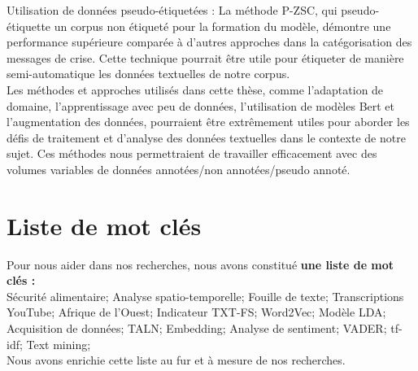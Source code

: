 \documentclass{article}
\begin{document}
Utilisation de données pseudo-étiquetées : La méthode P-ZSC, qui pseudo-étiquette un corpus non étiqueté pour la formation du modèle, démontre une performance supérieure comparée à d'autres approches dans la catégorisation des messages de crise. Cette technique pourrait être utile pour étiqueter de manière semi-automatique les données textuelles de notre corpus. \\

Les méthodes et approches utilisés dans cette thèse, comme l'adaptation de domaine, l'apprentissage avec peu de données, l'utilisation de modèles Bert et l'augmentation des données, pourraient être extrêmement utiles pour aborder les défis de traitement et d'analyse des données textuelles dans le contexte de notre sujet. Ces méthodes nous permettraient de travailler efficacement avec des volumes variables de données annotées/non annotées/pseudo annoté.

\section{Liste de mot clés}

Pour nous aider dans nos recherches, nous avons constitué \textbf{une liste de mot clés :} \\

Sécurité alimentaire; Analyse spatio-temporelle; Fouille de texte; Transcriptions YouTube; Afrique de l'Ouest; Indicateur TXT-FS; Word2Vec; Modèle LDA; Acquisition de données; TALN; Embedding; Analyse de sentiment; VADER; tf-idf; Text mining; \\

Nous avons enrichie cette liste au fur et à mesure de nos recherches. 
\end{document}
